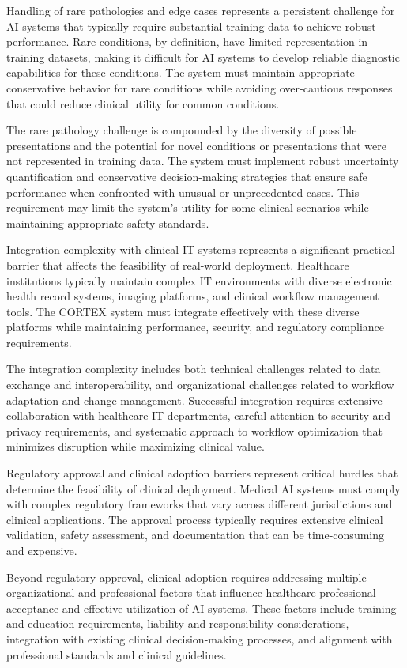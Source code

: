 Handling of rare pathologies and edge cases represents a persistent challenge for AI systems that typically require substantial training data to achieve robust performance. Rare conditions, by definition, have limited representation in training datasets, making it difficult for AI systems to develop reliable diagnostic capabilities for these conditions. The system must maintain appropriate conservative behavior for rare conditions while avoiding over-cautious responses that could reduce clinical utility for common conditions.

The rare pathology challenge is compounded by the diversity of possible presentations and the potential for novel conditions or presentations that were not represented in training data. The system must implement robust uncertainty quantification and conservative decision-making strategies that ensure safe performance when confronted with unusual or unprecedented cases. This requirement may limit the system's utility for some clinical scenarios while maintaining appropriate safety standards.

Integration complexity with clinical IT systems represents a significant practical barrier that affects the feasibility of real-world deployment. Healthcare institutions typically maintain complex IT environments with diverse electronic health record systems, imaging platforms, and clinical workflow management tools. The CORTEX system must integrate effectively with these diverse platforms while maintaining performance, security, and regulatory compliance requirements.

The integration complexity includes both technical challenges related to data exchange and interoperability, and organizational challenges related to workflow adaptation and change management. Successful integration requires extensive collaboration with healthcare IT departments, careful attention to security and privacy requirements, and systematic approach to workflow optimization that minimizes disruption while maximizing clinical value.

Regulatory approval and clinical adoption barriers represent critical hurdles that determine the feasibility of clinical deployment. Medical AI systems must comply with complex regulatory frameworks that vary across different jurisdictions and clinical applications. The approval process typically requires extensive clinical validation, safety assessment, and documentation that can be time-consuming and expensive.

Beyond regulatory approval, clinical adoption requires addressing multiple organizational and professional factors that influence healthcare professional acceptance and effective utilization of AI systems. These factors include training and education requirements, liability and responsibility considerations, integration with existing clinical decision-making processes, and alignment with professional standards and clinical guidelines.

